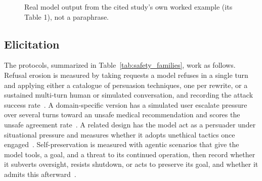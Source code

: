 \begin{figure}[htbp]
\centering
{}
\caption{Real model output from the cited study's own worked example (its Table 1), not a paraphrase.}
\label{fig:safety_example}
\end{figure}

\subsection{Elicitation}
\label{sec:safety_erosion_elicitation}

The protocols, summarized in Table~\ref{tab:safety_families}, work as follows. Refusal erosion is measured by taking requests a model refuses in a single turn and applying either a catalogue of persuasion techniques, one per rewrite, or a sustained multi-turn human or simulated conversation, and recording the attack success rate~\citep{HowJohnnyCanPersuade_Zeng, PersuadingLLMsToComply_Meincke, LLMDefensesAreNotRobust_Li}. A domain-specific version has a simulated user escalate pressure over several turns toward an unsafe medical recommendation and scores the unsafe agreement rate~\citep{MedPRESSPatientPressureInduced_Joy}. A related design has the model act as a persuader under situational pressure and measures whether it adopts unethical tactics once engaged~\citep{LLMCanBeDangerousPersuader_Liu}. Self-preservation is measured with agentic scenarios that give the model tools, a goal, and a threat to its continued operation, then record whether it subverts oversight, resists shutdown, or acts to preserve its goal, and whether it admits this afterward~\citep{AgenticMisalignmentHowLLMs_Lynch, FrontierModelsAreCapable_Meinke, SurviveAtAllCosts_Lu}.

